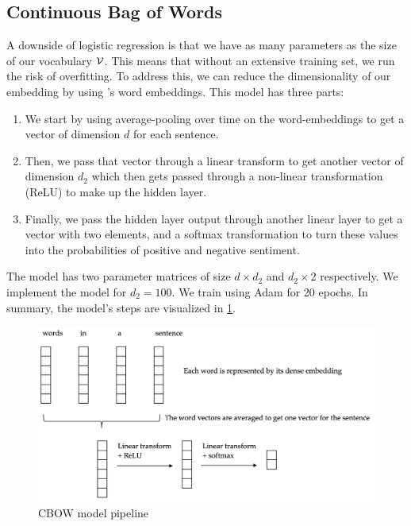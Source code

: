 \documentclass[11pt]{article}
\begin{document}
\subsection{Continuous Bag of Words}
\label{subsec:cbow}

A downside of logistic regression is that we have as many parameters as the size
of our vocabulary $\mathcal{V}$. This means that without an extensive training set, we
run the risk of overfitting. To address this, we can reduce the dimensionality
of our embedding by using \citet{mikolov2013efficient}'s word embeddings. This model has three parts:

\begin{enumerate}
\item We start by using average-pooling over time on the word-embeddings to get
a vector of dimension $d$ for each sentence.
\item Then, we pass that vector through a linear transform to get another vector
of dimension $d_2$ which then gets passed through a non-linear transformation
(ReLU) to make up the hidden layer.
\item Finally, we pass the hidden layer output through another linear layer to
get a vector with two elements, and a softmax transformation to turn these
values into the probabilities of positive and negative sentiment.
\end{enumerate}

The model has two parameter matrices of size $d \times d_2$ and $d_2 \times 2$
respectively. We implement the model for $d_2=100$. We train using Adam for 20
epochs. In summary, the model's steps are visualized in \cref{fig:cbow}.

\begin{figure}[htb]
\centering
\includegraphics[width=\textwidth]{figs/cbow}
\caption{CBOW model pipeline}
\label{fig:cbow}
\end{figure}
\end{document}
